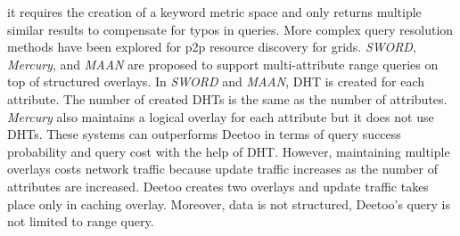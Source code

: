\documentclass[conference]{IEEEtran}
\begin{document}
it requires the creation of a keyword metric space and only returns multiple 
similar results to compensate for typos in queries. 
More complex query resolution methods have been explored for p2p resource 
discovery for grids. \emph{SWORD}\cite{sword}, 
\emph{Mercury}\cite{mercury}, and \emph{MAAN}\cite{maan} 
are proposed to support multi-attribute 
range queries on top of structured overlays.
In \emph{SWORD} and \emph{MAAN}, DHT is created for each attribute.
The number of created DHTs is the same as the number of attributes.
\emph{Mercury} also maintains a logical overlay for each attribute but
it does not use DHTs. These systems can outperforms Deetoo in terms of
query success probability and query cost with the help of DHT. However, 
maintaining multiple overlays costs network traffic
because update traffic increases as the number of attributes are 
increased. Deetoo creates two overlays and update traffic takes 
place only in caching overlay. Moreover, data is not structured,
Deetoo's query is not limited to range query.  

\end{document}
